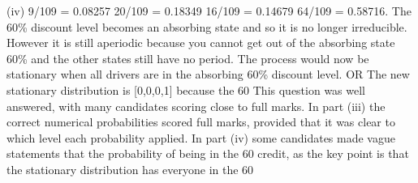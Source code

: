 \documentclass[a4paper,12pt]{article}
\begin{document}
(iv)
9/109 = 0.08257
20/109 = 0.18349
16/109 = 0.14679
64/109 = 0.58716.
The 60\% discount level becomes an absorbing state and so it is no longer irreducible. However it is still aperiodic because you cannot get out of the absorbing state 60\% and the other states still have no period.
The process would now be stationary when all drivers are in the absorbing 60\%
discount level.
OR
The new stationary distribution is [0,0,0,1] because the 60%
\newpage
This question was well answered, with many candidates scoring close to full marks. In part (iii) the correct numerical probabilities scored full marks, provided that it was clear to which level each probability applied. In part (iv) some candidates made vague statements that the
probability of being in the 60%
credit, as the key point is that the stationary distribution has everyone in the 60%
\end{document}
